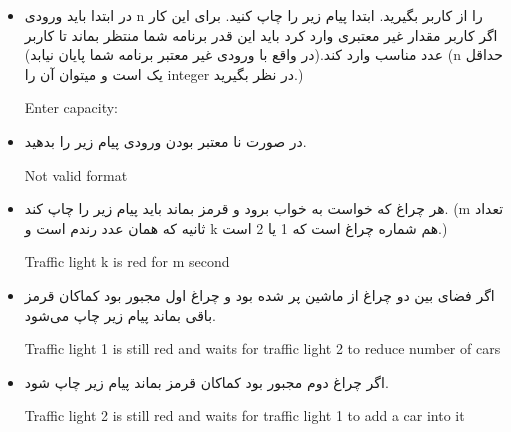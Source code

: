\documentclass[]{article}
\begin{document}
\begin{itemize}
\item
در ابتدا باید ورودی n را از کاربر بگیرید. ابتدا پیام زیر را چاپ کنید. برای 
این کار اگر کاربر مقدار غیر معتبری وارد کرد باید این قدر برنامه شما منتظر 
بماند تا کاربر عدد مناسب وارد کند.(در واقع با ورودی غیر معتبر برنامه شما 
پایان نیابد) (n حداقل یک است و میتوان آن را integer در نظر بگیرید.)
\begin{tcolorbox}[boxrule=0pt]
	\begin{latin}
		\large{
			Enter capacity:
		}
	\end{latin}
\end{tcolorbox}

\item
در صورت نا معتبر بودن ورودی پیام زیر را بدهید.
\begin{tcolorbox}[boxrule=0pt]
	\begin{latin}
		\large{
			Not valid format
		}
	\end{latin}
\end{tcolorbox}

\item
هر چراغ که خواست به خواب برود و قرمز بماند باید پیام زیر را چاپ کند. (m 
تعداد ثانیه که همان عدد رندم است و k هم شماره چراغ است که 1 یا 2 است.)
\begin{tcolorbox}[boxrule=0pt]
	\begin{latin}
		\large{
			Traffic light k is red for m second
		}
	\end{latin}
\end{tcolorbox}

\item
اگر فضای بین دو چراغ از ماشین پر شده بود و چراغ اول مجبور بود کماکان قرمز 
باقی بماند پیام زیر چاپ می‌شود.
\begin{tcolorbox}[boxrule=0pt]
	\begin{latin}
		\large{
			Traffic light 1 is still red and waits for traffic light 2 to 
			reduce number of cars
		}
	\end{latin}
\end{tcolorbox}

\item
اگر چراغ دوم مجبور بود کماکان قرمز بماند پیام زیر چاپ شود.
\begin{tcolorbox}[boxrule=0pt]
	\begin{latin}
		\large{
			Traffic light 2 is still red and waits for traffic light 1 to add a 
			car into it
		}
	\end{latin}
\end{tcolorbox}


\end{itemize}
\end{document}
